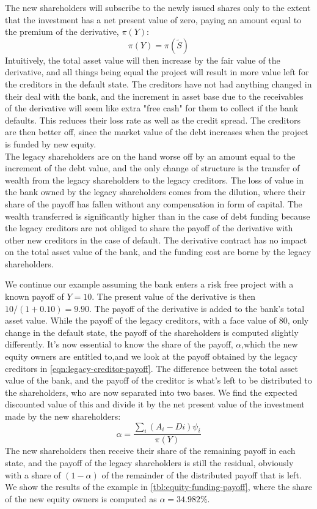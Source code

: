 \documentclass[../main.tex]{subfiles}
\begin{document}
        The new shareholders will subscribe to the newly issued shares only to the extent that the investment has a net present value of zero, paying an amount equal to the premium of the derivative, $\pi(Y)$:
        \begin{equation}
            \pi(Y) = \pi(\tilde{S})
        \end{equation}
        Intuitively, the total asset value will then increase by the fair value of the derivative, and all things being equal the project will result in more value left for the creditors in the default state. The creditors have not had anything changed in their deal with the bank, and the increment in asset base due to the receivables of the derivative will seem like extra "free cash" for them to collect if the bank defaults. This reduces their loss rate as well as the credit spread. The creditors are then better off, since the market value of the debt increases when the project is funded by new equity.\\
        The legacy shareholders are on the hand worse off by an amount equal to the increment of the debt value, and the only change of structure is the transfer of wealth from the legacy shareholders to the legacy creditors. The loss of value in the bank owned by the legacy shareholders comes from the dilution, where their share of the payoff has fallen without any compensation in form of capital. The wealth transferred is significantly higher than in the case of debt funding because the legacy creditors are not obliged to share the payoff of the derivative with other new creditors in the case of default. The derivative contract has no impact on the total asset value of the bank, and the funding cost are borne by the legacy shareholders.

        We continue our example assuming the bank enters a risk free project with a known payoff of $Y=10$. The present value of the derivative is then $10/(1+0.10)=9.90$. The payoff of the derivative is added to the bank's total asset value. While the payoff of the legacy creditors, with a face value of 80, only change in the default state, the payoff of the shareholders is computed slightly differently. It's now essential to know the share of the payoff, $\alpha$,which the new equity owners are entitled to,and we look at the payoff obtained by the legacy creditors in \cref{eqn:legacy-creditor-payoff}. The difference between the total asset value of the bank, and the payoff of the creditor is what's left to be distributed to the shareholders, who are now separated into two bases. We find the expected discounted value of this and divide it by the net present value of the investment made by the new shareholders:
        \begin{equation}
            \alpha = \frac{\sum_i (A_{i}-D{i})\psi_{i}}{\pi(Y)}
        \end{equation}
        The new shareholders then receive their share of the remaining payoff in each state, and the payoff of the legacy shareholders is still the residual, obviously with a share of $(1-\alpha)$ of the remainder of the distributed payoff that is left. We show the results of the example in \cref{tbl:equity-funding-payoff}, where the share of the new equity owners is computed as $\alpha = 34.982\%$.
\end{document}
